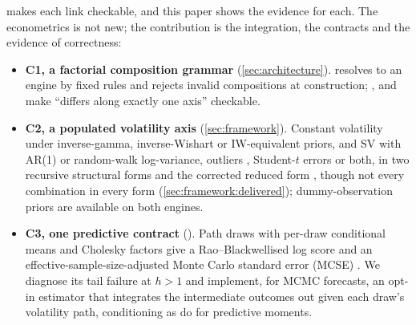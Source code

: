  makes each link checkable, and this paper shows the evidence for each.
The econometrics is not new; the contribution is the integration, the contracts and the evidence of correctness:
\begin{itemize}
\item \textbf{C1, a factorial composition grammar} (\cref{sec:architecture}).
   resolves to an engine by fixed rules and rejects invalid compositions at construction; ,  and  make ``differs along exactly one axis'' checkable. %
\item \textbf{C2, a populated volatility axis} (\cref{sec:framework}).
  Constant volatility under inverse-gamma, inverse-Wishart or IW-equivalent \citep{chan2022asymmetric} priors, and SV with AR(1) or random-walk log-variance, outliers \citep{carriero2024addressing}, Student-$t$ errors \citep{jacquier2004bayesian} or both, in two recursive structural forms and the corrected reduced form \citep{carriero2022corrigendum}, though not every combination in every form (\cref{sec:framework:delivered}); dummy-observation priors \citep{doan1984forecasting,sims1998bayesian,giannone2015prior} are available on both engines. %
\item \textbf{C3, one predictive contract} ().
  Path draws with per-draw conditional means and Cholesky factors give a Rao--Blackwellised log score and an effective-sample-size-adjusted Monte Carlo standard error (MCSE) \citep{geweke2010comparing,kruger2021predictive}. %
  We diagnose its tail failure at $h>1$ and implement, for MCMC forecasts, an opt-in estimator that integrates the intermediate outcomes out given each draw's volatility path, conditioning as \citet{hiraki2026dynamic} do for predictive moments. %

\end{itemize}
